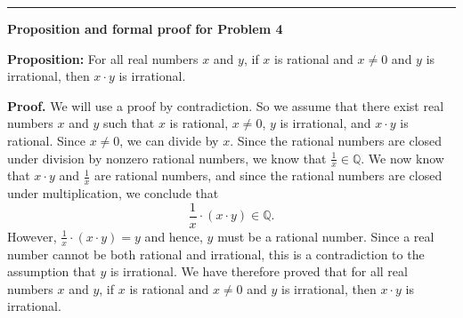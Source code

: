 \documentclass[12pt]{article}
\theoremstyle{definition}
\begin{document}
\bigskip

\hrule

\bigskip
\bigskip

\textbf{Proposition and formal proof for Problem 4}

\textbf{Proposition:} For all real numbers \( x \) and \( y \), if \( x \) is rational and \( x \neq 0 \) and \( y \) is irrational, then \( x \cdot y \) is irrational.

\textbf{Proof.} We will use a proof by contradiction. So we assume that there exist real numbers \( x \) and \( y \) such that \( x \) is rational, \( x \neq 0 \), \( y \) is irrational, and \( x \cdot y \) is rational. Since \( x \neq 0 \), we can divide by \( x \). Since the rational numbers are closed under division by nonzero rational numbers, we know that \( \frac{1}{x} \in \mathbb{Q} \). We now know that \( x \cdot y \) and \( \frac{1}{x} \) are rational numbers, and since the rational numbers are closed under multiplication, we conclude that
\[
\frac{1}{x} \cdot (x \cdot y) \in \mathbb{Q}.
\]
However, \( \frac{1}{x} \cdot (x \cdot y) = y \) and hence, \( y \) must be a rational number. Since a real number cannot be both rational and irrational, this is a contradiction to the assumption that \( y \) is irrational. We have therefore proved that for all real numbers \( x \) and \( y \), if \( x \) is rational and \( x \neq 0 \) and \( y \) is irrational, then \( x \cdot y \) is irrational.

\end{document}
